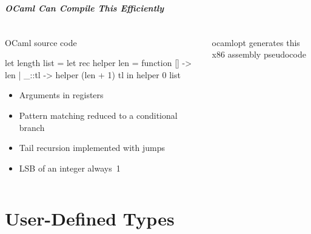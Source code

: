 \documentclass{plt}
\begin{document}
\begin{frame}[fragile]
  \frametitle{OCaml Can Compile This Efficiently}


  \begin{columns}
    \begin{column}[t]{0.6\textwidth}

OCaml source code

\medskip

\begin{ocaml}
let length list =
  let rec helper len = function
      []    -> len
    | _::tl -> helper (len + 1) tl
  in helper 0 list
\end{ocaml}

\begin{itemize}
\item Arguments in registers
\item Pattern matching reduced to a conditional branch
\item Tail recursion implemented with jumps
\item LSB of an integer always~1
\end{itemize}

    \end{column}
    \begin{column}[t]{0.4\textwidth}
ocamlopt generates this x86 assembly pseudocode 

\medskip

    \end{column}
  \end{columns}

\end{frame}

\part{User-Defined Types}
\end{document}
